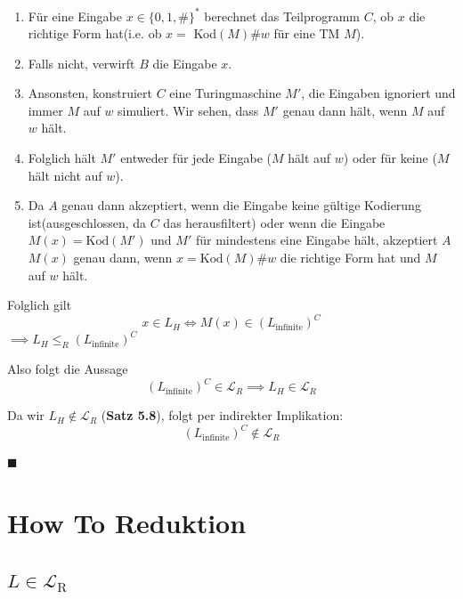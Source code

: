 \documentclass[a4paper, 11pt]{article}
\def\L{\mathcal{L}}
\def\Lr{\mathcal{L}_\text{R}}
\begin{document}
            
                \begin{enumerate}[label=\Roman*.]
                    \item Für eine Eingabe $x \in \{0,1,\#\}^*$ berechnet das Teilprogramm $C$, ob $x$ die richtige Form hat(i.e. ob $x = $ Kod$(M)\#w$ für eine TM $M$).
                    \item Falls nicht, verwirft $B$ die Eingabe $x$.
                    
                    \item Ansonsten, konstruiert $C$ eine Turingmaschine $M'$, die Eingaben ignoriert und immer $M$ auf $w$ simuliert. Wir sehen, dass $M'$ genau dann hält, wenn $M$ auf $w$ hält. 
                    \item Folglich hält $M'$ entweder für jede Eingabe ($M$ hält auf $w$) oder für keine ($M$ hält nicht auf $w$).
                     
                    \item Da $A$ genau dann akzeptiert, wenn die Eingabe keine gültige Kodierung ist(ausgeschlossen, da $C$ das herausfiltert) oder wenn die Eingabe $M(x)= \text{Kod}(M')$ und $M'$ für mindestens eine Eingabe hält, akzeptiert $A$ $M(x)$ genau dann, wenn $x = \text{Kod}(M)\#w$ die richtige Form hat und $M$ auf $w$ hält.
                \end{enumerate}
                
                
                Folglich gilt $$x \in L_H \iff M(x) \in (L_{\text{infinite}})^C$$
                $\implies L_H \leq_R (L_{\text{infinite}})^C$ 
            
                Also folgt die Aussage
                $$(L_{\text{infinite}})^C \in \L_R \implies L_H \in \L_R$$
            
                Da wir $L_H \notin \L_R$ (\textbf{Satz 5.8}), folgt per indirekter Implikation:
                $$(L_{\text{infinite}})^C \notin \L_R$$
            
                \hspace*{0pt}\hfill$\blacksquare$
            
            \section{How To Reduktion}
            
                \subsection{$L \in \Lr$ }
\end{document}
